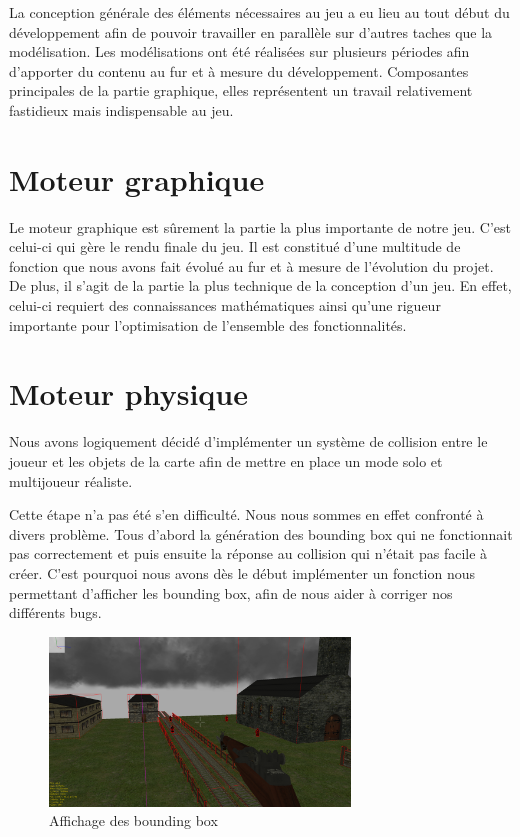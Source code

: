 \documentclass[11pt]{report}
\begin{document}
La conception générale des éléments nécessaires au jeu a eu lieu au tout début du développement afin de pouvoir travailler en parallèle sur d’autres taches que la modélisation. Les modélisations ont été réalisées sur plusieurs périodes afin d’apporter du contenu au fur et à mesure du développement. Composantes principales de la partie graphique, elles représentent un travail relativement fastidieux mais indispensable au jeu. 

\chapter{Moteur graphique}

Le moteur graphique est sûrement la partie la plus importante de notre jeu. C'est celui-ci qui gère le rendu finale du jeu. Il est constitué d'une multitude de fonction que nous avons fait évolué au fur et à mesure de l'évolution du projet. De plus, il s'agit de la partie la plus technique de la conception d'un jeu. En effet, celui-ci requiert des connaissances mathématiques ainsi qu'une rigueur importante pour l'optimisation de l'ensemble des fonctionnalités.



\chapter{Moteur physique}

Nous avons logiquement décidé d’implémenter un système de collision entre le joueur et les objets de la carte afin de mettre en place un mode solo et multijoueur réaliste.

Cette étape n'a pas été s'en difficulté. Nous nous sommes en effet confronté à divers problème. Tous d'abord la génération des bounding box qui ne fonctionnait pas correctement et puis ensuite la réponse au collision qui n'était pas facile à créer. C'est pourquoi nous avons dès le début implémenter un fonction nous permettant d'afficher les bounding box, afin de nous aider à corriger nos différents bugs.

\begin{figure}[htbp]
\centering
\includegraphics[width=8cm]{affichage-box.png}
\caption{Affichage des bounding box}
\end{figure}
\end{document}
